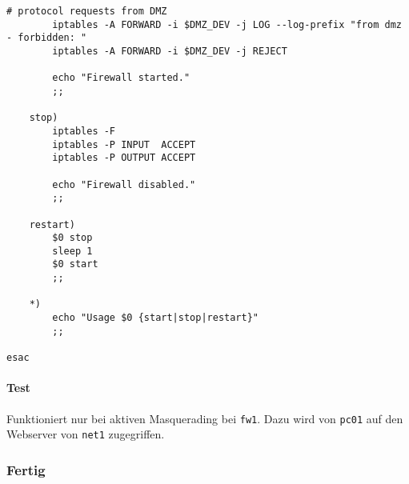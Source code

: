 \begin{lstlisting}[label=lst:masq,caption={Basisskript interne Firewall.}]
        # protocol requests from DMZ
        iptables -A FORWARD -i $DMZ_DEV -j LOG --log-prefix "from dmz - forbidden: "
        iptables -A FORWARD -i $DMZ_DEV -j REJECT

        echo "Firewall started."
        ;;

    stop)
        iptables -F
        iptables -P INPUT  ACCEPT
        iptables -P OUTPUT ACCEPT

        echo "Firewall disabled."
        ;;

    restart)
        $0 stop
        sleep 1
        $0 start
        ;;

    *)
        echo "Usage $0 {start|stop|restart}"
        ;;

esac
\end{lstlisting}

\paragraph{Test} Funktioniert nur bei aktiven Masquerading bei {\tt fw1}.
Dazu wird von {\tt pc01} auf den Webserver von {\tt net1} zugegriffen.


\subsubsection{Fertig}

